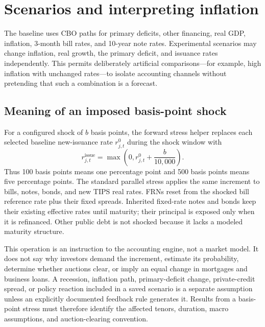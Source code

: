 \documentclass[10pt]{article}
\begin{document}
\section{Scenarios and interpreting inflation}

The baseline uses CBO paths for primary deficits, other financing, real GDP, inflation,
3-month bill rates, and 10-year note rates.  Experimental scenarios may change inflation,
real growth, the primary deficit, and issuance rates independently.  This permits
deliberately artificial comparisons---for example, high inflation with unchanged rates---to
isolate accounting channels without pretending that such a combination is a forecast.

\subsection*{Meaning of an imposed basis-point shock}

For a configured shock of $b$ basis points, the forward stress helper replaces each selected
baseline new-issuance rate $r^0_{j,t}$ during the shock window with
\begin{equation}
 r^{\mathrm{issue}}_{j,t}=\max\left(0,r^0_{j,t}+\frac{b}{10{,}000}\right).
\end{equation}
Thus 100 basis points means one percentage point and 500 basis points means five percentage
points.  The standard parallel stress applies the same increment to bills, notes, bonds,
and new TIPS real rates.  FRNs reset from the shocked bill reference rate plus their fixed
spreads.  Inherited fixed-rate notes and bonds keep their existing effective rates until
maturity; their principal is exposed only when it is refinanced.  Other public debt is not
shocked because it lacks a modeled maturity structure.

This operation is an instruction to the accounting engine, not a market model.  It does not
say why investors demand the increment, estimate its probability, determine whether auctions
clear, or imply an equal change in mortgages and business loans.  A recession, inflation
path, primary-deficit change, private-credit spread, or policy reaction included in a saved
scenario is a separate assumption unless an explicitly documented feedback rule generates
it.  Results from a basis-point stress must therefore identify the affected tenors, duration,
macro assumptions, and auction-clearing convention.
\end{document}
